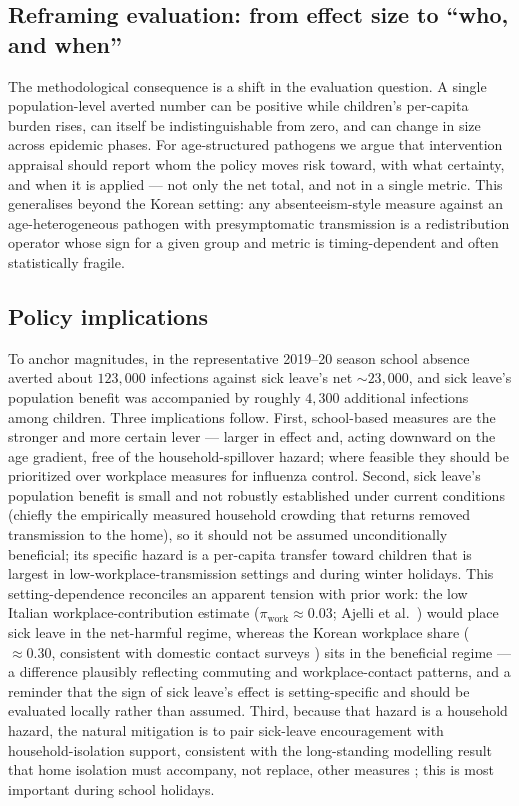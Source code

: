 \documentclass[12pt]{article}
\theoremstyle{plain}
\theoremstyle{remark}
\theoremstyle{definition}
\begin{document}
\subsection{Reframing evaluation: from effect size to ``who, and when''}
The methodological consequence is a shift in the evaluation question. A single population-level averted number can be positive while children's per-capita burden rises, can itself be indistinguishable from zero, and can change in size across epidemic phases. For age-structured pathogens we argue that intervention appraisal should report whom the policy moves risk toward, with what certainty, and when it is applied --- not only the net total, and not in a single metric. This generalises beyond the Korean setting: any absenteeism-style measure against an age-heterogeneous pathogen with presymptomatic transmission is a redistribution operator whose sign for a given group and metric is timing-dependent and often statistically fragile.

\subsection{Policy implications}
To anchor magnitudes, in the representative 2019--20 season school absence averted about $123{,}000$ infections against sick leave's net $\sim$$23{,}000$, and sick leave's population benefit was accompanied by roughly $4{,}300$ additional infections among children. Three implications follow. First, school-based measures are the stronger and more certain lever --- larger in effect and, acting downward on the age gradient, free of the household-spillover hazard; where feasible they should be prioritized over workplace measures for influenza control. Second, sick leave's population benefit is small and not robustly established under current conditions (chiefly the empirically measured household crowding that returns removed transmission to the home), so it should not be assumed unconditionally beneficial; its specific hazard is a per-capita transfer toward children that is largest in low-workplace-transmission settings and during winter holidays. This setting-dependence reconciles an apparent tension with prior work: the low Italian workplace-contribution estimate ($\pi_{\mathrm{work}}\approx0.03$; Ajelli et al.\ \cite{Ajelli2014}) would place sick leave in the net-harmful regime, whereas the Korean workplace share ($\approx0.30$, consistent with domestic contact surveys \cite{Son2025}) sits in the beneficial regime --- a difference plausibly reflecting commuting and workplace-contact patterns, and a reminder that the sign of sick leave's effect is setting-specific and should be evaluated locally rather than assumed. Third, because that hazard is a household hazard, the natural mitigation is to pair sick-leave encouragement with household-isolation support, consistent with the long-standing modelling result that home isolation must accompany, not replace, other measures \cite{Halloran2008,Davey2008}; this is most important during school holidays.
\end{document}
